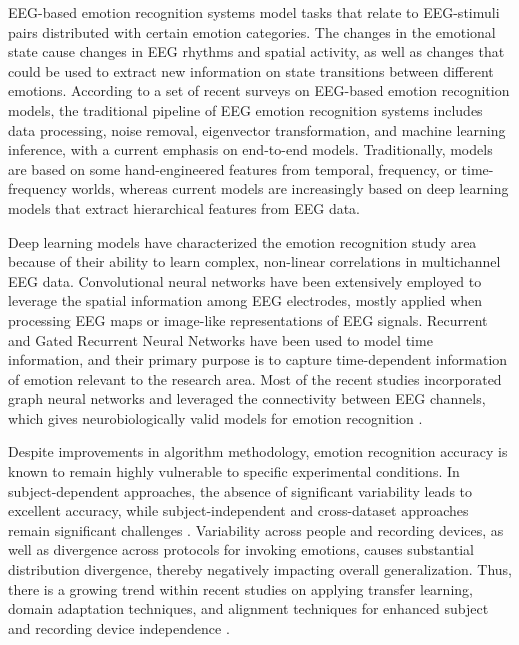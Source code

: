 \documentclass{WileyMSP-template}
\begin{document}
EEG-based emotion recognition systems model tasks that relate to EEG-stimuli pairs distributed with certain emotion categories. The changes in the emotional state cause changes in EEG rhythms and spatial activity, as well as changes that could be used to extract new information on state transitions between different emotions. According to a set of recent surveys on EEG-based emotion recognition models, the traditional pipeline of EEG emotion recognition systems includes data processing, noise removal, eigenvector transformation, and machine learning inference, with a current emphasis on end-to-end models. Traditionally, models are based on some hand-engineered features from temporal, frequency, or time-frequency worlds, whereas current models are increasingly based on deep learning models that extract hierarchical features from EEG data.

Deep learning models have characterized the emotion recognition study area because of their ability to learn complex, non-linear correlations in multichannel EEG data. Convolutional neural networks have been extensively employed to leverage the spatial information among EEG electrodes, mostly applied when processing EEG maps or image-like representations of EEG signals. Recurrent and Gated Recurrent Neural Networks have been used to model time information, and their primary purpose is to capture time-dependent information of emotion relevant to the research area. Most of the recent studies incorporated graph neural networks and leveraged the connectivity between EEG channels, which gives neurobiologically valid models for emotion recognition \cite{li2022transferreview,ma2024peerjreview}.

Despite improvements in algorithm methodology, emotion recognition accuracy is known to remain highly vulnerable to specific experimental conditions. In subject-dependent approaches, the absence of significant variability leads to excellent accuracy, while subject-independent and cross-dataset approaches remain significant challenges \cite{li2022transferreview,hamzah2024heliyon}. Variability across people and recording devices, as well as divergence across protocols for invoking emotions, causes substantial distribution divergence, thereby negatively impacting overall generalization. Thus, there is a growing trend within recent studies on applying transfer learning, domain adaptation techniques, and alignment techniques for enhanced subject and recording device independence \cite{li2022transferreview,hamzah2024heliyon}.
\end{document}
